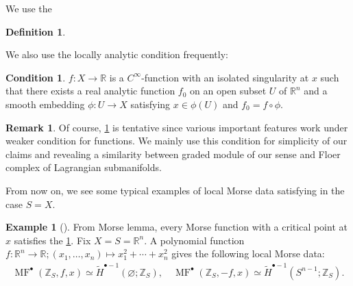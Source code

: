 \documentclass[a4paper,dvipdfmx,reqno,12pt]{amsart}
\theoremstyle{definition}
\newtheorem{definition}[theorem]{Definition}
\newtheorem{example}[theorem]{Example}
\newtheorem{remark}[theorem]{Remark}
\newtheorem{condition}[theorem]{Condition}
\newcommand{\emp}{\varnothing}%
\newcommand{\Z}{\mathbb{Z}}%
\newcommand{\opn}[1]{\operatorname{#1}}
\numberwithin{equation}{section}
\begin{document}

We use the 

\begin{definition}

\end{definition}

We also use the locally analytic condition frequently:

\begin{condition}
\label{condition-local-analytic}
$f\colon X\to \mathbb{R}$ is a $C^{\infty}$-function
with an isolated singularity at $x$ such that 
there exists a real analytic function $f_0$ on an open 
subset $U$ of $\mathbb{R}^{n}$ and a smooth embedding
$\phi \colon U\to X$ satisfying $x\in \phi(U)$ and
$f_0=f\circ \phi$.
\end{condition}

\iffalse
\begin{definition}

\end{definition}
\fi


\begin{remark}
Of course, \cref{condition-local-analytic} is tentative
since various important
features work under weaker condition for functions. 
We mainly use this condition for
simplicity of our claims and revealing a similarity between
graded module of our sense and Floer complex of Lagrangian 
submanifolds.
\end{remark}

From now on, we see some typical examples of local
Morse data satisfying 
in the case $S=X$.

\begin{example}[{\cite[p.22]{MR2031639}}]
From Morse lemma, every Morse function with a critical 
point at $x$ satisfies the \cref{condition-local-analytic}.
Fix $X=S={\mathbb{R}}^{n}$.
A polynomial function 
$f\colon {\mathbb{R}}^{n}\to {\mathbb{R}};(x_1,\ldots,x_n)\mapsto x_1^{2}+
\cdots+x_n^{2}$ gives the following local Morse data:
\begin{align}
    \opn{MF}^{\bullet}(\Z_S,f,x)\simeq \tilde{H}^{\bullet-1}(\emp;\Z_S),
    \quad \opn{MF}^{\bullet}(\Z_S,-f,x) \simeq \tilde{H}^{\bullet-1}(S^{n-1};\Z_S).
  \end{align}
\end{example}
\end{document}
